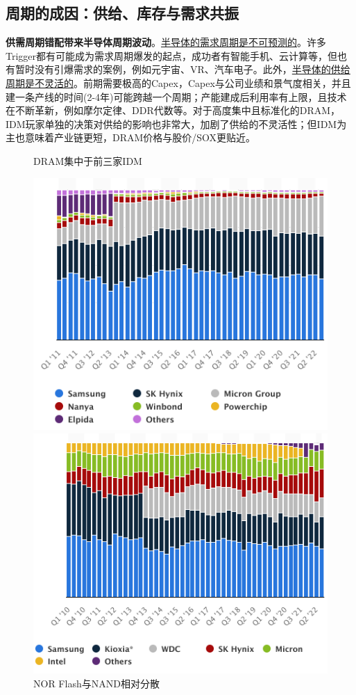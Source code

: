\documentclass[a4paper,12pt]{ctexart}
\begin{document}
\subsection{周期的成因：供给、库存与需求共振}
\textbf{供需周期错配带来半导体周期波动}。\uline{半导体的需求周期是不可预测的}。许多Trigger都有可能成为需求周期爆发的起点，成功者有智能手机、云计算等，但也有暂时没有引爆需求的案例，例如元宇宙、VR、汽车电子。此外，\uline{半导体的供给周期是不灵活的}。前期需要极高的Capex，Capex与公司业绩和景气度相关，并且建一条产线的时间(2-4年)可能跨越一个周期；产能建成后利用率有上限，且技术在不断革新，例如摩尔定律、DDR代数等。对于高度集中且标准化的DRAM，IDM玩家单独的决策对供给的影响也非常大，加剧了供给的不灵活性；但IDM为主也意味着产业链更短，DRAM价格与股价/SOX更贴近。
\begin{figure}[H]
    \begin{minipage}{0.48\linewidth}
        \caption{DRAM集中于前三家IDM}
        \centering
        \includegraphics[width=\linewidth]{img/dram.png}
    \end{minipage}
    \begin{minipage}{0.48\linewidth}
        \caption{NOR Flash与NAND相对分散}
        \centering
        \includegraphics[width=\linewidth]{img/nand.png}

\end{minipage}
\end{figure}
\end{document}
